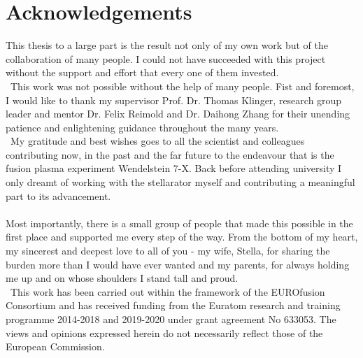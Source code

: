 %
\chapter{Acknowledgements}\label{sec:acknowledgement}%
%
    This thesis to a large part is the result not only of my own work but of the collaboration of many people. I could not have succeeded with this project without the support and effort that every one of them invested.\\%
%
    \,\newline%
    This work was not possible without the help of many people. Fist and foremost, I would like to thank my supervisor Prof. Dr. Thomas Klinger, research group leader and mentor Dr. Felix Reimold and Dr. Daihong Zhang for their unending patience and enlightening guidance throughout the many years.\\%
%
    \,\newline%
    My gratitude and best wishes goes to all the scientist and colleagues contributing now, in the past and the far future to the endeavour that is the fusion plasma experiment Wendelstein 7-X. Back before attending university I only dreamt of working with the stellarator myself and contributing a meaningful part to its advancement.\\%
%
    \,\\%
    Most importantly, there is a small group of people that made this possible in the first place and supported me every step of the way. From the bottom of my heart, my sincerest and deepest love to all of you -  my wife, Stella, for sharing the burden more than I would have ever wanted and my parents, for always holding me up and on whose shoulders I stand tall and proud.\\%
%
    \,\newline%
    This work has been carried out within the framework of the EUROfusion Consortium and has received funding from the Euratom research and training programme 2014-2018 and 2019-2020 under grant agreement No 633053. The views and opinions expressed herein do not necessarily reflect those of the European Commission.
%